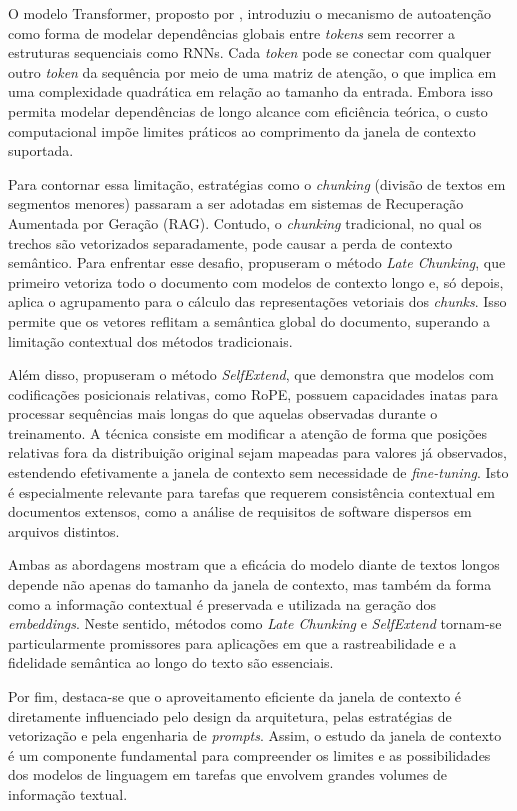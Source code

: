 O modelo Transformer, proposto por , introduziu o mecanismo de autoatenção como forma de modelar dependências globais entre \textit{tokens} sem recorrer a estruturas sequenciais como RNNs. Cada \textit{token} pode se conectar com qualquer outro \textit{token} da sequência por meio de uma matriz de atenção, o que implica em uma complexidade quadrática em relação ao tamanho da entrada. Embora isso permita modelar dependências de longo alcance com eficiência teórica, o custo computacional impõe limites práticos ao comprimento da janela de contexto suportada.

Para contornar essa limitação, estratégias como o \textit{chunking} (divisão de textos em segmentos menores) passaram a ser adotadas em sistemas de Recuperação Aumentada por Geração (RAG). Contudo, o \textit{chunking} tradicional, no qual os trechos são vetorizados separadamente, pode causar a perda de contexto semântico. Para enfrentar esse desafio,  propuseram o método \textit{Late Chunking}, que primeiro vetoriza todo o documento com modelos de contexto longo e, só depois, aplica o agrupamento para o cálculo das representações vetoriais dos \textit{chunks}. Isso permite que os vetores reflitam a semântica global do documento, superando a limitação contextual dos métodos tradicionais.

Além disso,  propuseram o método \textit{SelfExtend}, que demonstra que modelos com codificações posicionais relativas, como RoPE, possuem capacidades inatas para processar sequências mais longas do que aquelas observadas durante o treinamento. A técnica consiste em modificar a atenção de forma que posições relativas fora da distribuição original sejam mapeadas para valores já observados, estendendo efetivamente a janela de contexto sem necessidade de \textit{fine-tuning}. Isto é especialmente relevante para tarefas que requerem consistência contextual em documentos extensos, como a análise de requisitos de software dispersos em arquivos distintos.

Ambas as abordagens mostram que a eficácia do modelo diante de textos longos depende não apenas do tamanho da janela de contexto, mas também da forma como a informação contextual é preservada e utilizada na geração dos \textit{embeddings}. Neste sentido, métodos como \textit{Late Chunking} e \textit{SelfExtend} tornam-se particularmente promissores para aplicações em que a rastreabilidade e a fidelidade semântica ao longo do texto são essenciais.

Por fim, destaca-se que o aproveitamento eficiente da janela de contexto é diretamente influenciado pelo design da arquitetura, pelas estratégias de vetorização e pela engenharia de \textit{prompts}. Assim, o estudo da janela de contexto é um componente fundamental para compreender os limites e as possibilidades dos modelos de linguagem em tarefas que envolvem grandes volumes de informação textual.

